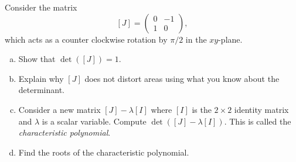 \documentclass[12pt]{article} %
\begin{document}
\newpage
\begin{problem}
Consider the matrix 
\[
[J] = \begin{pmatrix} 0 & -1 \\ 1 & 0 \end{pmatrix},
\]
which acts as a counter clockwise rotation by $\pi/2$ in the $xy$-plane.  
\begin{enumerate}[(a)]
    \item Show that $\det([J])=1$.
    \item Explain why $[J]$ does not distort areas using what you know about the determinant.
    \item Consider a new matrix $[J]-\lambda [I]$ where $[I]$ is the $2\times 2$ identity matrix and $\lambda$ is a scalar variable.  Compute $\det([J]-\lambda [I])$. This is called the \emph{characteristic polynomial}.
    \item Find the roots of the characteristic polynomial.
\end{enumerate}
\end{problem}
\end{document}
